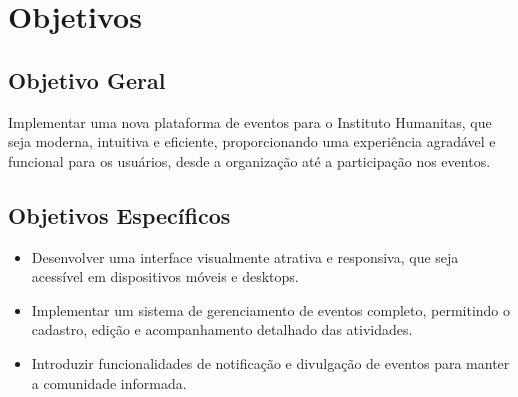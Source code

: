 \section{Objetivos}

\subsection{Objetivo Geral}

Implementar uma nova plataforma de eventos para o Instituto Humanitas, que seja moderna, intuitiva e eficiente, proporcionando uma experiência agradável e funcional para os usuários, desde a organização até a participação nos eventos.

\subsection{Objetivos Específicos}

\begin{itemize}
  \item Desenvolver uma interface visualmente atrativa e responsiva, que seja acessível em dispositivos móveis e desktops.
  \item Implementar um sistema de gerenciamento de eventos completo, permitindo o cadastro, edição e acompanhamento detalhado das atividades.
  \item Introduzir funcionalidades de notificação e divulgação de eventos para manter a comunidade informada.
\end{itemize}